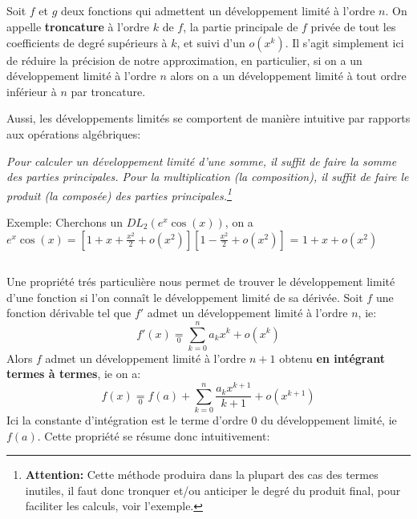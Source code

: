\subsection*{}
Soit \(f\) et \(g\) deux fonctions qui admettent un développement limité à l'ordre \(n\).\+
On appelle \textbf{troncature} à l'ordre \(k\) de \(f\), la partie principale de \(f\) privée de tout les coefficients de degré supérieurs à \(k\), et suivi d'un \(o(x^k)\). Il s'agit simplement ici de réduire la précision de notre approximation, en particulier, si on a un développement limité à l'ordre \(n\) alors on a un développement limité à tout ordre inférieur à \(n\) par troncature.\<

Aussi, les développements limités se comportent de manière intuitive par rapports aux opérations algébriques:
\begin{center}
   \textit{Pour calculer un développement limité d'une somme, il suffit de faire la somme des parties principales. \+
   Pour la multiplication (la composition), il suffit de faire le produit (la composée) des parties principales.\footnote[1]{\textbf{Attention:} Cette méthode produira dans la plupart des cas des termes inutiles, il faut donc tronquer et/ou anticiper le degré du produit final, pour faciliter les calculs, voir l'exemple.} }
\end{center}

Exemple: Cherchons un \(DL_2(e^x\cos(x))\), on a \(e^x\cos(x) = [1 + x + \frac{x^2}{2}+o(x^2)] [1 - \frac{x^2}{2} + o(x^2)]  \) = \(1 + x + o(x^2)\)

\subsection*{}
Une propriété trés particulière nous permet de trouver le développement limité d'une fonction si l'on connaît le développement limité de sa dérivée.\+ 
Soit \(f\) une fonction dérivable tel que \(f'\) admet un développement limité à l'ordre \(n\), ie:
\[
   f'(x) \underset{0}{=} \sum_{k=0}^{n} a_kx^k + o(x^k)   
\]
Alors \(f\) admet un développement limité à l'ordre \(n + 1\) obtenu \textbf{en intégrant termes à termes}, ie on a:
\[
   f(x) \underset{0}{=} f(a) + \sum_{k=0}^{n} \frac{a_k x^{k+1}}{k+1} + o(x^{k+1})   
\]
Ici la constante d'intégration est le terme d'ordre 0 du développement limité, ie \(f(a)\). Cette propriété se résume donc intuitivement:
\begin{center}
\end{center}

